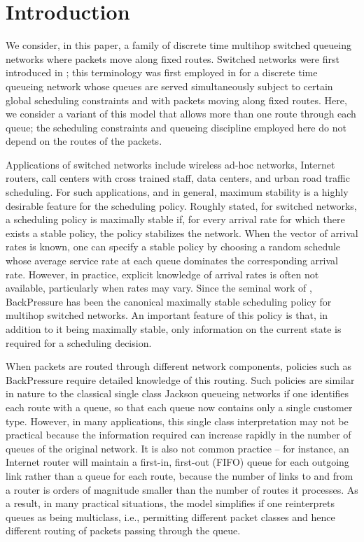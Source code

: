 \documentclass{amsart}
\begin{document}
\maketitle

\section{Introduction}
We consider, in this paper, a family of discrete time multihop switched queueing networks where packets move along fixed routes. Switched networks were first introduced in \cite{TaEp92}; this
terminology was first employed in \cite{ShWi12} for a discrete time queueing network whose queues are served simultaneously subject to certain global scheduling constraints and with packets moving along fixed routes. 
Here, we consider a variant of this model that allows more than one route through
each queue; the scheduling constraints and queueing discipline employed here do not depend on the routes of the packets.

 Applications of switched networks include 
 wireless ad-hoc networks,
 Internet routers, call centers with cross trained staff,
 data centers, and
 urban road traffic scheduling. 
For such applications, and in general,
maximum stability is a highly desirable feature for the scheduling policy.
Roughly stated, for switched networks, a scheduling policy is maximally stable if, for every arrival rate for which there exists a stable policy, the policy stabilizes the network.
When the vector of arrival rates is known, one can specify a stable policy
by choosing a random schedule whose average service rate at each queue dominates the corresponding arrival rate.
However, in practice, explicit knowledge of arrival rates is often not available, particularly when rates may vary. Since the seminal work of \cite{TaEp92},  BackPressure has been the canonical maximally stable scheduling policy 
for multihop switched networks. An important feature of this policy is that, in addition to it
being maximally stable, only information on the current state is required for a scheduling decision.

When packets are routed through different network components, policies such as BackPressure require detailed knowledge of this routing.  Such policies are similar in nature to the classical single class Jackson queueing networks if one identifies each route with a queue, so that each queue now contains only a single customer type. However, in many applications, this single class interpretation may not be practical  because the information required can increase rapidly in the number of queues of the original network.  It is also not common practice --
for instance, an Internet router will maintain a first-in, first-out (FIFO) queue for each outgoing link rather than a queue for each route, because the number of links to and from a router is orders of magnitude smaller than the number of routes it  processes. 
As a result, in many practical situations, the model simplifies if one reinterprets 
queues as being multiclass, i.e., permitting different packet classes and hence different routing of packets passing through the queue. 
\end{document}
